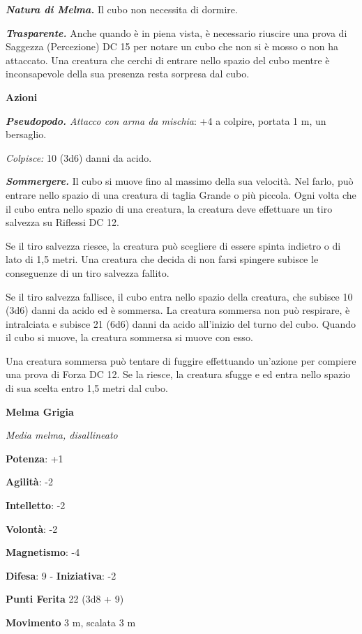 \begin{multicols}{2}
\emph{\textbf{Natura di Melma.}} Il cubo non necessita di dormire.

\emph{\textbf{Trasparente.}} Anche quando è in piena vista, è necessario
riuscire una prova di Saggezza (Percezione) DC 15 per notare un cubo che
non si è mosso o non ha attaccato. Una creatura che cerchi di entrare
nello spazio del cubo mentre è inconsapevole della sua presenza resta
sorpresa dal cubo.

\smallskip\textbf{Azioni}

\emph{\textbf{Pseudopodo.} Attacco con arma da mischia}: +4 a colpire,
portata 1 m, un bersaglio.

\emph{Colpisce:} 10 (3d6) danni da acido.

\emph{\textbf{Sommergere.}} Il cubo si muove fino al massimo della sua
velocità. Nel farlo, può entrare nello spazio di una creatura di taglia
Grande o più piccola. Ogni volta che il cubo entra nello spazio di una
creatura, la creatura deve effettuare un tiro salvezza su Riflessi DC
12.

Se il tiro salvezza riesce, la creatura può scegliere di essere spinta
indietro o di lato di 1,5 metri. Una creatura che decida di non farsi
spingere subisce le conseguenze di un tiro salvezza fallito.

Se il tiro salvezza fallisce, il cubo entra nello spazio della creatura,
che subisce 10 (3d6) danni da acido ed è sommersa. La creatura sommersa
non può respirare, è intralciata e subisce 21 (6d6) danni da acido
all'inizio del turno del cubo. Quando il cubo si muove, la creatura
sommersa si muove con esso.

Una creatura sommersa può tentare di fuggire effettuando un'azione per
compiere una prova di Forza DC 12. Se la riesce, la creatura sfugge e ed
entra nello spazio di sua scelta entro 1,5 metri dal cubo.

\textbf{Melma Grigia}

\emph{Media melma, disallineato}

\textbf{Potenza}: +1

\textbf{Agilità}: -2

\textbf{Intelletto}: -2

\textbf{Volontà}: -2

\textbf{Magnetismo}: -4

\textbf{Difesa}: 9 - \textbf{Iniziativa}: -2

\textbf{Punti Ferita} 22 (3d8 + 9)

\textbf{Movimento} 3 m, scalata 3 m


\end{multicols}
